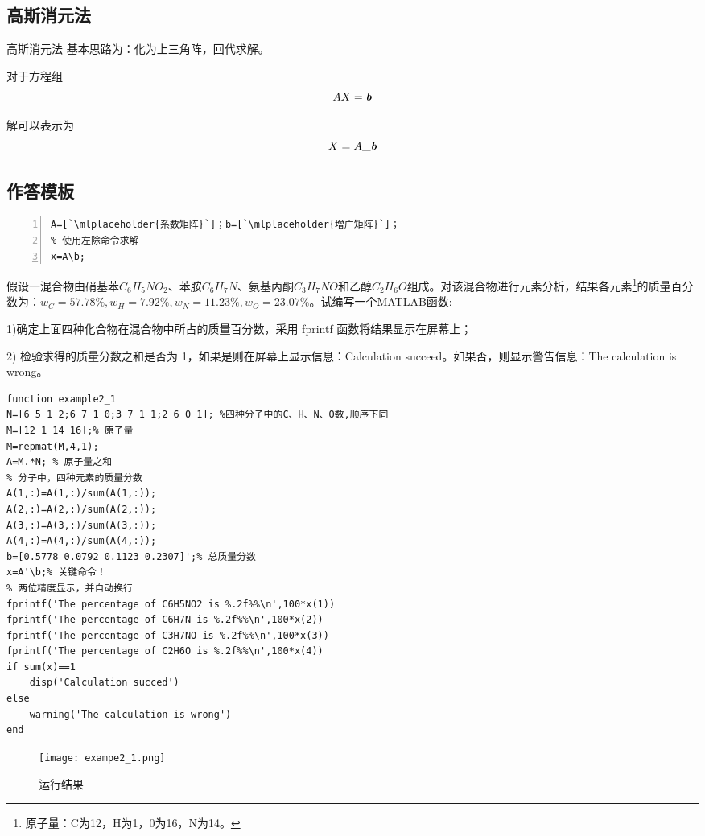 \subsection{高斯消元法}
\begin{definition}{高斯消元法}{}
基本思路为：化为上三角阵，回代求解。
\end{definition}

对于方程组
\[
AX=\emph{\textbf{b}}
\]

解可以表示为
\[
X=A\_\emph{\textbf{b}}
\]
\subsection{作答模板}
\begin{lstlisting}[frame=single,numbers=left]
% 得到所需矩阵A、b，注意对齐方式！
A=[`\mlplaceholder{系数矩阵}`]；b=[`\mlplaceholder{增广矩阵}`]；
% 使用左除命令求解
x=A\b;
\end{lstlisting}
\begin{problem}
假设一混合物由硝基苯$C_6H_5NO_2$、苯胺$C_6H_7N$、氨基丙酮$C_3H_7NO$和乙醇$C_2H_6O$组成。对该混合物进行元素分析，结果各元素\footnote{原子量：C为12，H为1，0为16，N为14。}的质量百分数为：$w_C=57.78\%,w_H= 7.92\%,w_N= 11.23\%,w_O= 23.07\%$。试编写一个MATLAB函数:

1)确定上面四种化合物在混合物中所占的质量百分数，采用 fprintf 函数将结果显示在屏幕上；

2) 检验求得的质量分数之和是否为 1，如果是则在屏幕上显示信息：Calculation succeed。如果否，则显示警告信息：The calculation is wrong。
\end{problem}

\begin{solution}
\begin{lstlisting}
function example2_1
N=[6 5 1 2;6 7 1 0;3 7 1 1;2 6 0 1]; %四种分子中的C、H、N、O数,顺序下同
M=[12 1 14 16];% 原子量
M=repmat(M,4,1);
A=M.*N; % 原子量之和
% 分子中，四种元素的质量分数
A(1,:)=A(1,:)/sum(A(1,:));
A(2,:)=A(2,:)/sum(A(2,:));
A(3,:)=A(3,:)/sum(A(3,:));
A(4,:)=A(4,:)/sum(A(4,:));
b=[0.5778 0.0792 0.1123 0.2307]';% 总质量分数
x=A'\b;% 关键命令！
% 两位精度显示，并自动换行
fprintf('The percentage of C6H5NO2 is %.2f%%\n',100*x(1))
fprintf('The percentage of C6H7N is %.2f%%\n',100*x(2))
fprintf('The percentage of C3H7NO is %.2f%%\n',100*x(3))
fprintf('The percentage of C2H6O is %.2f%%\n',100*x(4))
if sum(x)==1
    disp('Calculation succed')
else
    warning('The calculation is wrong')
end
\end{lstlisting}

\begin{figure}[htbp]
\centering
\texttt{[image: exampe2\_1.png]}
\caption{运行结果}
\end{figure}

\end{solution}